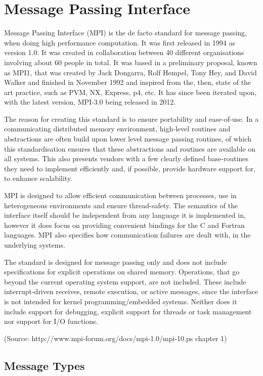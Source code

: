 \chapter{Message Passing Interface}
Message Passing Interface (MPI) is the de facto standard for message passing, when doing high performance computation. It was first released in 1994 as version 1.0. It was created in collaboration between 40 different organisations involving about 60 people in total. It was based in a preliminary proposal, known as MPI1, that was created by Jack Dongarra, Rolf Hempel, Tony Hey, and David Walker and finished in November 1992 and inspired from the, then, state of the art practice, such as PVM, NX, Express, p4, etc. It has since been iterated upon, with the latest version, MPI-3.0 being released in 2012.

The reason for creating this standard is to ensure portability and ease-of-use. In a communicating distributed memory environment, high-level routines and abstractions are often build upon lower level message passing routines, of which this standardisation ensures that these abstractions and routines are available on all systems. This also presents vendors with a few clearly defined base-routines they need to implement efficiently and, if possible, provide hardware support for, to enhance scalability.

MPI is designed to allow efficient communication between processes, use in heterogeneous environments and ensure thread-safety. The semantics of the interface itself should be independent from any language it is implemented in, however it does focus on providing convenient bindings for the C and Fortran languages. MPI also specifies how communication failures are dealt with, in the underlying systems.

The standard is designed for message passing only and does not include specifications for explicit operations on shared memory. Operations, that go beyond the current operating system support, are not included. These include interrupt-driven receives, remote execution, or active messages, since the interface is not intended for kernel programming/embedded systems. Neither does it include support for debugging, explicit support for threads or task management nor support for I/O functions.

(Source: http://www.mpi-forum.org/docs/mpi-1.0/mpi-10.ps chapter 1)

\section{Message Types}

